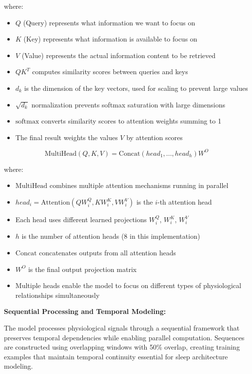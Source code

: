 \documentclass[a4paper,12pt,twoside]{article}
\begin{document}
where:
\begin{itemize}
    \item $Q$ (Query) represents what information we want to focus on
    \item $K$ (Key) represents what information is available to focus on
    \item $V$ (Value) represents the actual information content to be retrieved
    \item $QK^T$ computes similarity scores between queries and keys
    \item $d_k$ is the dimension of the key vectors, used for scaling to prevent large values
    \item $\sqrt{d_k}$ normalization prevents softmax saturation with large dimensions
    \item $\text{softmax}$ converts similarity scores to attention weights summing to 1
    \item The final result weights the values $V$ by attention scores
\end{itemize}

$$\text{MultiHead}(Q, K, V) = \text{Concat}(head_1, ..., head_h)W^O$$

where:
\begin{itemize}
    \item $\text{MultiHead}$ combines multiple attention mechanisms running in parallel
    \item $head_i = \text{Attention}(QW_i^Q, KW_i^K, VW_i^V)$ is the $i$-th attention head
    \item Each head uses different learned projections $W_i^Q$, $W_i^K$, $W_i^V$
    \item $h$ is the number of attention heads (8 in this implementation)
    \item $\text{Concat}$ concatenates outputs from all attention heads
    \item $W^O$ is the final output projection matrix
    \item Multiple heads enable the model to focus on different types of physiological relationships simultaneously
\end{itemize}

\textbf{Sequential Processing and Temporal Modeling:}

The model processes physiological signals through a sequential framework that preserves temporal dependencies while enabling parallel computation. Sequences are constructed using overlapping windows with 50\% overlap, creating training examples that maintain temporal continuity essential for sleep architecture modeling.
\end{document}
